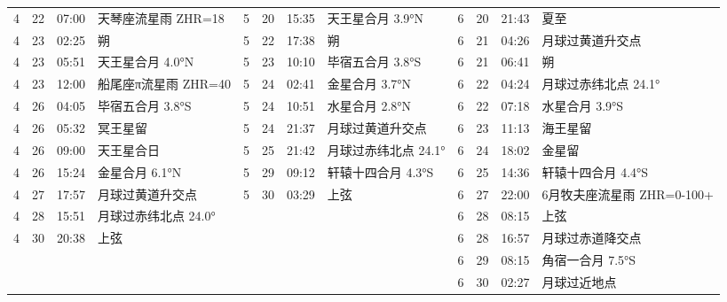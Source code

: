 \begin{tabular}{llll|llll|llll}
4 & 22 & 07:00 & 天琴座流星雨 ZHR=18 & 5 & 20 & 15:35 & 天王星合月 3.9°N & 6 & 20 & 21:43 & 夏至 \tabularnewline
4 & 23 & 02:25 & 朔 & 5 & 22 & 17:38 & 朔 & 6 & 21 & 04:26 & 月球过黄道升交点 \tabularnewline
4 & 23 & 05:51 & 天王星合月 4.0°N & 5 & 23 & 10:10 & 毕宿五合月 3.8°S & 6 & 21 & 06:41 & 朔 \tabularnewline
4 & 23 & 12:00 & 船尾座π流星雨 ZHR=40 & 5 & 24 & 02:41 & 金星合月 3.7°N & 6 & 22 & 04:24 & 月球过赤纬北点 24.1° \tabularnewline
4 & 26 & 04:05 & 毕宿五合月 3.8°S & 5 & 24 & 10:51 & 水星合月 2.8°N & 6 & 22 & 07:18 & 水星合月 3.9°S \tabularnewline
4 & 26 & 05:32 & 冥王星留 & 5 & 24 & 21:37 & 月球过黄道升交点 & 6 & 23 & 11:13 & 海王星留 \tabularnewline
4 & 26 & 09:00 & 天王星合日 & 5 & 25 & 21:42 & 月球过赤纬北点 24.1° & 6 & 24 & 18:02 & 金星留 \tabularnewline
4 & 26 & 15:24 & 金星合月 6.1°N & 5 & 29 & 09:12 & 轩辕十四合月 4.3°S & 6 & 25 & 14:36 & 轩辕十四合月 4.4°S \tabularnewline
4 & 27 & 17:57 & 月球过黄道升交点 & 5 & 30 & 03:29 & 上弦 & 6 & 27 & 22:00 & 6月牧夫座流星雨 ZHR=0-100+ \tabularnewline
4 & 28 & 15:51 & 月球过赤纬北点 24.0° &  &  &  &  & 6 & 28 & 08:15 & 上弦 \tabularnewline
4 & 30 & 20:38 & 上弦 &  &  &  &  & 6 & 28 & 16:57 & 月球过赤道降交点 \tabularnewline
 &  &  &  &  &  &  &  & 6 & 29 & 08:15 & 角宿一合月 7.5°S \tabularnewline
 &  &  &  &  &  &  &  & 6 & 30 & 02:27 & 月球过近地点 \tabularnewline
\hline \end{tabular}

